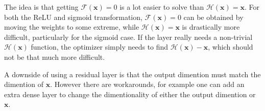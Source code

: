 The idea is that getting $\mathcal{F}(\mathbf{x}) = 0$ is a lot easier to solve than $\mathcal{H}(\mathbf{x}) = \mathbf{x}$. For both the ReLU and sigmoid transformation, $\mathcal{F}(\mathbf{x}) = 0$ can be obtained by moving the weights to some extreme, while $\mathcal{H}(\mathbf{x}) = \mathbf{x}$ is drastically more difficult, particularly for the sigmoid case. If the layer really needs a non-trivial $\mathcal{H}(\mathbf{x})$ function, the optimizer simply needs to find $\mathcal{H}(\mathbf{x}) - \mathbf{x}$, which should not be that much more difficult.

A downside of using a residual layer is that the output dimention must match the dimention of $\mathbf{x}$. However there are workarounds, for example one can add an extra dense layer to change the dimentionality of either the output dimention or $\mathbf{x}$.